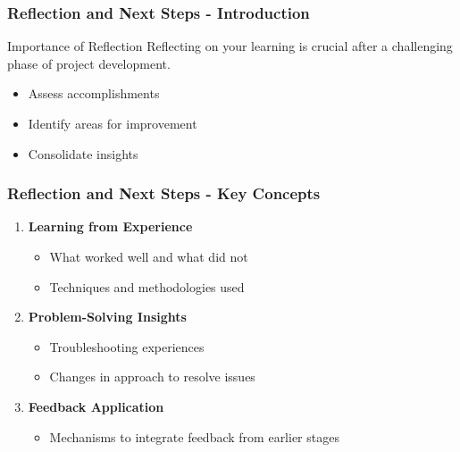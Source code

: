 \documentclass[aspectratio=169]{beamer}
\begin{document}
\begin{frame}[fragile]
    \frametitle{Reflection and Next Steps - Introduction}
    \begin{block}{Importance of Reflection}
        Reflecting on your learning is crucial after a challenging phase of project development.
        \begin{itemize}
            \item Assess accomplishments
            \item Identify areas for improvement
            \item Consolidate insights
        \end{itemize}
    \end{block}
\end{frame}

\begin{frame}[fragile]
    \frametitle{Reflection and Next Steps - Key Concepts}
    \begin{enumerate}
        \item \textbf{Learning from Experience}
            \begin{itemize}
                \item What worked well and what did not
                \item Techniques and methodologies used
            \end{itemize}
        
        \item \textbf{Problem-Solving Insights}
            \begin{itemize}
                \item Troubleshooting experiences
                \item Changes in approach to resolve issues
            \end{itemize}
        
        \item \textbf{Feedback Application}
            \begin{itemize}
                \item Mechanisms to integrate feedback from earlier stages
            \end{itemize}
    \end{enumerate}
\end{frame}
\end{document}
